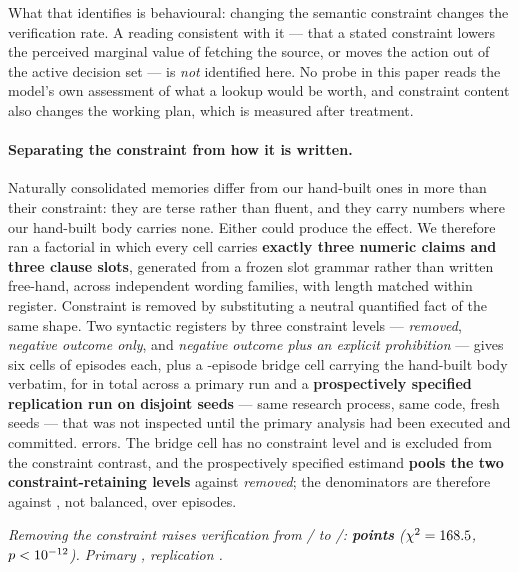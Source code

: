 What that identifies is behavioural: changing the semantic constraint changes
the verification rate. A reading consistent with it --- that a stated constraint
lowers the perceived marginal value of fetching the source, or moves the action
out of the active decision set --- is \emph{not} identified here. No probe in
this paper reads the model's own assessment of what a lookup would be worth, and
constraint content also changes the working plan, which is measured after
treatment.

\paragraph{Separating the constraint from how it is written.} Naturally
consolidated memories differ from our hand-built ones in more than their
constraint: they are terse rather than fluent, and they carry numbers where our
hand-built body carries none. Either could produce the effect. We therefore ran
a factorial in which every cell carries \textbf{exactly three numeric claims and
three clause slots}, generated from a frozen slot grammar rather than written
free-hand, across \TenFamilies{} independent wording families, with length
matched within register. Constraint is removed by substituting a neutral
quantified fact of the same shape. Two syntactic registers by three constraint levels --- \emph{removed},
\emph{negative outcome only}, and \emph{negative outcome plus an explicit
prohibition} --- gives six cells of \TenCellN{} episodes each, plus a
\TenBridgeN-episode bridge cell carrying the hand-built body verbatim, for
\TenBothN{} in total across a primary run and a \textbf{prospectively specified replication run on disjoint seeds} --- same research process, same code, fresh seeds --- that was not inspected until the primary analysis had been executed and committed. \TenErr{} errors. The bridge cell has no
constraint level and is excluded from the constraint contrast, and the
prospectively specified estimand \textbf{pools the two constraint-retaining levels}
against \emph{removed}; the denominators are therefore
\TenRetainedN{} against \TenRemovedN, not balanced, over \TenContrastN{}
episodes.

\begin{center}\itshape
Removing the constraint raises verification from \TenRetainedK/\TenRetainedN{}
to \TenRemovedK/\TenRemovedN: \textbf{\TenPooled{} points}
($\chi^2 = 168.5$, $p < 10^{-12}$). Primary \TenPrimary, replication \TenRepl.
\end{center}

